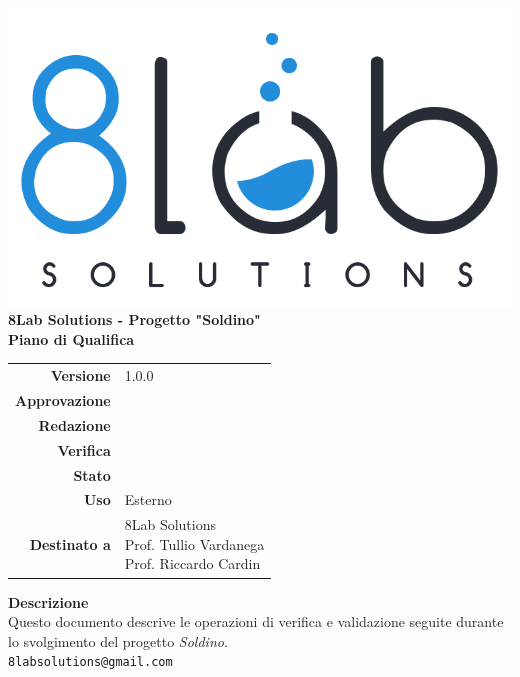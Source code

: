 \thispagestyle{empty}
\begin{titlepage}
	\begin{center}
		\includegraphics[scale = 0.3]{res/images/logo8_crop.png}\\
		\large \textbf{8Lab Solutions - Progetto "Soldino"} \\
		\vfill
		\Huge \textbf{Piano di Qualifica}
		\vspace*{\fill} 
        \vfill
        \large
        \begin{tabular}{r|l}
                        \textbf{Versione} & 1.0.0\\
                        \textbf{Approvazione} &\\
                        \textbf{Redazione} &\\
                        \textbf{Verifica} &\\
                        \textbf{Stato} &\\
                        \textbf{Uso} & Esterno\\
                        \textbf{Destinato a} & \parbox[t]{5cm}{8Lab Solutions\\Prof. Tullio Vardanega\\Prof. Riccardo Cardin}
                \end{tabular}
                \vfill
                \normalsize
                \textbf{Descrizione}\\
                Questo documento descrive le operazioni di verifica e validazione seguite durante lo svolgimento del progetto \textit{Soldino}.\\
                \vfill
                \small
                \texttt{8labsolutions@gmail.com}
	\end{center}
\end{titlepage}